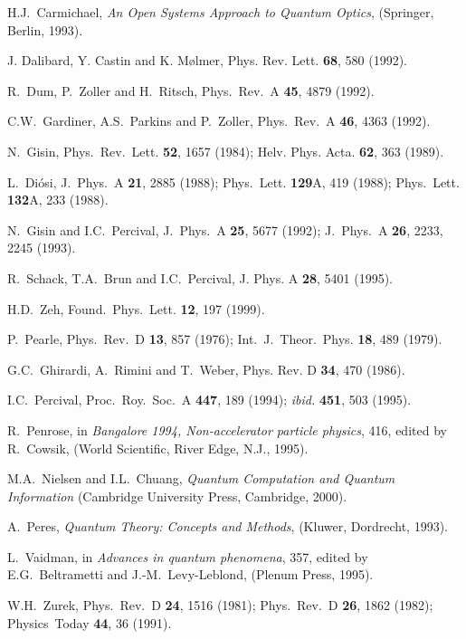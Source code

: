 \begin{thebibliography}{99}

 H.J.~Carmichael,
{\sl An Open Systems Approach to Quantum Optics},
(Springer, Berlin, 1993).

 J. Dalibard, Y. Castin and K. M\o lmer,
Phys. Rev. Lett. {\bf 68}, 580 (1992).

 R.~Dum, P.~Zoller and H.~Ritsch, Phys.~Rev.~A {\bf 45},
4879 (1992).

 C.W.~Gardiner, A.S.~Parkins and P.~Zoller,
Phys.~Rev.~A {\bf 46}, 4363 (1992).

 N.~Gisin, Phys.~Rev.~Lett. {\bf 52}, 1657 (1984);
Helv. Phys. Acta. {\bf 62}, 363 (1989).

 L.~Di\'osi, J.~Phys.~A {\bf 21}, 2885 (1988);
Phys.~Lett. {\bf 129}A, 419 (1988); Phys.~Lett.
{\bf 132}A, 233 (1988).

 N.~Gisin and I.C.~Percival, J.~Phys.~A {\bf 25}, 5677 (1992);
J.~Phys.~A {\bf 26}, 2233, 2245 (1993).

 R.~Schack, T.A.~Brun and I.C.~Percival, 
J. Phys. A {\bf 28}, 5401 (1995).

 H.D.~Zeh, Found.~Phys.~Lett. {\bf 12}, 197 (1999).

 P.~Pearle, Phys.~Rev.~D {\bf 13}, 857 (1976);
Int.~J.~Theor.~Phys. {\bf 18}, 489 (1979).

 G.C.~Ghirardi, A.~Rimini and T.~Weber,
Phys. Rev. D {\bf 34}, 470 (1986).

 I.C.~Percival, Proc.~Roy.~Soc.~A {\bf 447}, 189 (1994);
{\it ibid.\/} {\bf 451}, 503 (1995).

 R.~Penrose, in {\sl Bangalore 1994, Non-accelerator
particle physics}, 416, edited by R.~Cowsik,
(World Scientific, River Edge, N.J., 1995).

  M.A.~Nielsen and I.L.~Chuang, {\sl Quantum
Computation and Quantum Information} (Cambridge University Press,
Cambridge, 2000).

 A.~Peres, {\sl Quantum Theory:  Concepts and Methods},
(Kluwer, Dordrecht, 1993).

 L.~Vaidman, in {\sl Advances in quantum phenomena}, 357,
edited by E.G.~Beltrametti and J.-M.~Levy-Leblond, (Plenum Press, 1995).

 W.H.~Zurek, Phys.~Rev.~D {\bf 24}, 1516 (1981);
Phys.~Rev.~D {\bf 26}, 1862 (1982); Physics~Today {\bf 44}, 36 (1991).


\end{thebibliography}
